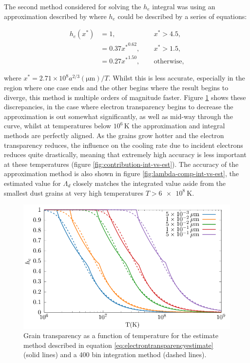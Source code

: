 
The second method considered for solving the $h_e$ integral was using an approximation described by \cite{dwek_infrared_1981} where $h_e$ could be described by a series of equations:

\begin{equation}
  \begin{alignedat}{3}
    h_e(x^*) & = 1 ,                && ~~ x^* > 4.5, \\
    & = 0.37{x^*}^{0.62} , && ~~ x^* > 1.5 , \\
    & = 0.27{x^*}^{1.50} , && ~~ \text{otherwise,}
  \end{alignedat} \label{eq:electrontransparencyestimate}
\end{equation}

\noindent
where $x^* = 2.71 \times 10^8 a^{2/3}(\si{\micro\metre}) /T$.
Whilst this is less accurate, especially in the region where one case ends and the other begins where the result begins to diverge, this method is multiple orders of magnitude faster.
Figure \ref{fig:graintransacc} shows these discrepancies, in the case where electron transparency begins to decrease the approximation is out somewhat significantly, as well as mid-way through the curve, whilst at temperatures below $10^6 \, \si{\kelvin}$ the approximation and integral methods are perfectly aligned.
As the grains grow hotter and the electron transparency reduces, the influence on the cooling rate due to incident electrons reduces quite drastically, meaning that extremely high accuracy is less important at these temperatures (figure \ref{fig:contribution-int-vs-est}).
The accuracy of the approximation method is also shown in figure \ref{fig:lambda-comp-int-vs-est}, the estimated value for $\Lambda_d$ closely matches the integrated value aside from the smallest dust grains at very high temperatures $T>\SI{6e8}{\kelvin}$.

\begin{figure}
  \centering
  \includegraphics{assets/grain-transparency/grain-trans.pdf}
  \caption[Electron transparency method accuracy - $h_e$]{Grain transparency as a function of temperature for the estimate method described in equation \ref{eq:electrontransparencyestimate} (solid lines) and a 400 bin integration method (dashed lines).}
  \label{fig:graintransacc}
\end{figure}

